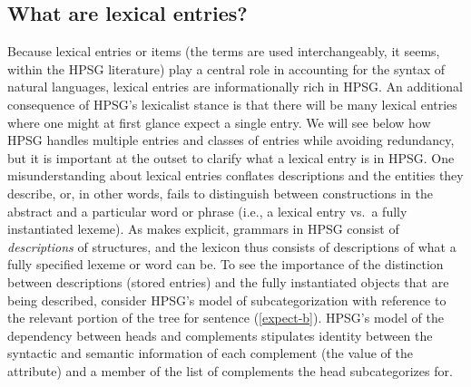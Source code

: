 \documentclass[output=paper
 	        ,biblatex
                ,babelshorthands
                ,newtxmath
                ,draftmode
                ,colorlinks, citecolor=brown
]{langscibook}
\begin{document}
\subsection{What are lexical entries?}

Because lexical entries or items (the terms are used interchangeably, it seems, within the HPSG literature) play a central role in accounting for the syntax of natural languages, lexical entries are informationally rich in HPSG. 
An additional consequence of HPSG's lexicalist stance is that there will be many lexical entries where one might at first glance expect a single entry. We will see below how HPSG handles multiple entries and classes of entries while avoiding redundancy, but it is important at the outset to clarify what a lexical entry is in HPSG. 
One misunderstanding about lexical entries conflates descriptions and the entities they describe, or, in other words, fails to distinguish between constructions in the abstract and a particular word or phrase (i.e., a lexical entry vs.\ a fully instantiated lexeme). 
As  makes explicit, grammars in HPSG consist of \emph{descriptions} of structures, and the lexicon thus consists of descriptions of what a fully specified lexeme or word can be. 
To see the importance of the distinction between descriptions (stored entries) and the fully instantiated objects that are being described, consider HPSG's model of subcategorization with reference to the relevant portion of the tree for sentence (\ref{expect-b}). 
HPSG's model of the dependency between heads and complements stipulates identity between the syntactic and semantic information of each complement (the value of the  attribute) and a member of the list of complements the head subcategorizes for. 
\end{document}
